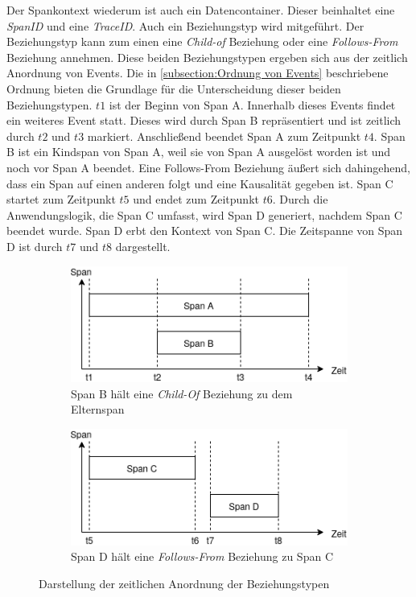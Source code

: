 Der Spankontext wiederum ist auch ein Datencontainer. Dieser beinhaltet eine \emph{SpanID} und eine \emph{TraceID}. Auch ein Beziehungstyp wird mitgeführt. Der Beziehungstyp kann zum einen eine \emph{Child-of} Beziehung oder eine \emph{Follows-From} Beziehung annehmen. Diese beiden Beziehungstypen ergeben sich aus der zeitlich Anordnung von Events. Die in \cref{subsection:Ordnung von Events} beschriebene Ordnung  bieten die Grundlage für die Unterscheidung dieser beiden Beziehungstypen. $t1$ ist der Beginn von Span A. Innerhalb dieses Events findet ein weiteres Event statt. Dieses wird durch Span B repräsentiert und ist zeitlich durch $t2$ und $t3$ markiert. Anschließend beendet Span A zum Zeitpunkt $t4$. Span B ist ein Kindspan von Span A, weil sie von Span A ausgelöst worden ist und noch vor Span A beendet. Eine Follows-From Beziehung äußert sich dahingehend, dass ein Span auf einen anderen folgt und eine Kausalität gegeben ist. Span C startet zum Zeitpunkt $t5$ und endet zum Zeitpunkt $t6$. Durch die Anwendungslogik, die Span C umfasst, wird Span D generiert, nachdem Span C beendet wurde. Span D erbt den Kontext von Span C. Die Zeitspanne von Span D ist durch $t7$ und $t8$ dargestellt.
 
\begin{figure}[]
	\centering
	\begin{subfigure}[t]{.49\linewidth}
		\centering\includegraphics[width=.8\linewidth]{img/Design/SpanBeziehungstypenA.png}
		\caption[Abbildung]{Span B hält eine \emph{Child-Of} Beziehung zu dem Elternspan}
		\label{fig:SpanBeziehungstypenA}
	\end{subfigure}
	\begin{subfigure}[t]{.49\linewidth}
		\centering\includegraphics[width=.8\linewidth]{img/Design/SpanBeziehungstypenB.png}
		\caption[Abbildung]{Span D hält eine \emph{Follows-From} Beziehung zu Span C}
		\label{fig:SpanBeziehungstypenB}
	\end{subfigure}
	\caption[Darstellung der zeitlichen Anordnung der Beziehungstypen]{Darstellung der zeitlichen Anordnung der Beziehungstypen}
\end{figure} 


